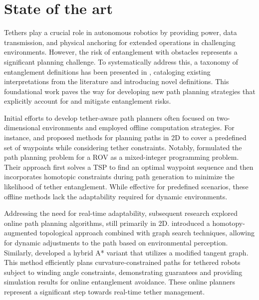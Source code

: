 \section{State of the art}
\label{sec:related_work}

Tethers play a crucial role in autonomous robotics by providing power, data transmission, and physical anchoring for extended operations in challenging environments. However, the risk of entanglement with obstacles represents a significant planning challenge. To systematically address this, a taxonomy of entanglement definitions has been presented in \cite{definitions}, cataloging existing interpretations from the literature and introducing novel definitions. This foundational work paves the way for developing new path planning strategies that explicitly account for and mitigate entanglement risks.

Initial efforts to develop tether-aware path planners often focused on two-dimensional environments and employed offline computation strategies. For instance, \cite{rov_mccammon} and \cite{mechsy2017novel} proposed methods for planning paths in 2D to cover a predefined set of waypoints while considering tether constraints. Notably, \cite{mechsy2017novel} formulated the path planning problem for a \ac{ROV} as a mixed-integer programming problem. Their approach first solves a \ac{TSP} to find an optimal waypoint sequence and then incorporates homotopic constraints during path generation to minimize the likelihood of tether entanglement. While effective for predefined scenarios, these offline methods lack the adaptability required for dynamic environments.

Addressing the need for real-time adaptability, subsequent research explored online path planning algorithms, still primarily in 2D. \cite{kim} introduced a homotopy-augmented topological approach combined with graph search techniques, allowing for dynamic adjustments to the path based on environmental perception. Similarly, \cite{withy} developed a hybrid A* variant that utilizes a modified tangent graph. This method efficiently plans curvature-constrained paths for tethered robots subject to winding angle constraints, demonstrating guarantees and providing simulation results for online entanglement avoidance. These online planners represent a significant step towards real-time tether management.

